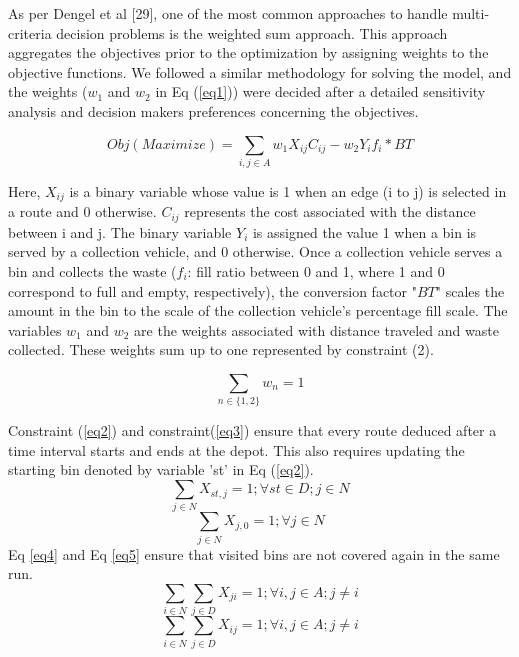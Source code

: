 \documentclass[12pt]{article}
\begin{document}
As per Dengel et al [29], one of the most common approaches to handle multi-criteria decision problems is the weighted sum approach. This approach aggregates the objectives prior to the optimization by assigning weights to the objective functions. We followed a similar methodology for solving the model, and the weights ($w_1$ and $w_2$ in Eq (\ref{eq1}))   were decided after a detailed sensitivity analysis and decision makers preferences concerning the objectives.

\begin{equation}\label{eq1}
    Obj(Maximize)=\sum_{i,j \in A} w_1 X_{ij} C_{ij} - w_2 Y_i f_i * BT
\end{equation}

Here, $X_{ij}$ is a binary variable whose value is 1 when an edge (i to j) is selected in a route and 0 otherwise. $C_{ij}$ represents the cost associated with the distance between i and j. The binary variable $Y_{i}$ is assigned the value 1 when a bin is served by a collection vehicle, and 0 otherwise. Once a collection vehicle serves a bin and collects the waste ($f_i$: fill ratio between 0 and 1, where 1 and 0 correspond to full and empty, respectively), the conversion factor "$BT$" scales the amount in the bin to the scale of the collection vehicle's percentage fill scale. The variables $w_1$ and $w_2$ are the weights associated with distance traveled and waste collected. These weights sum up to one represented by constraint (2).

\begin{equation}\label{eq1.5}
    \sum_{n\in \{1,2\}} w_n = 1
\end{equation}


Constraint (\ref{eq2}) and constraint(\ref{eq3}) ensure that every route deduced after a time interval starts and ends at the depot. This also requires updating the starting bin denoted by variable 'st' in Eq (\ref{eq2}).
\begin{equation}\label{eq2}
    \sum_{j\in N}X_{st,j}=1 ; \forall st \in D ; j \in N
\end{equation}
\begin{equation}\label{eq3}
    \sum_{j\in N}X_{j,0}=1 ; \forall j \in N
\end{equation}
Eq \eqref{eq4} and Eq \eqref{eq5} ensure that visited bins are not covered again in the same run.
\begin{equation}\label{eq4}
    \sum_{i\in N}\sum_{j\in D } X_{ji}=1 ; \forall i,j \in A ; j\ne i
\end{equation}
\begin{equation}\label{eq5}
    \sum_{i\in N}\sum_{j\in D } X_{ij}=1 ; \forall i,j \in A ; j\ne i
\end{equation}
\end{document}

